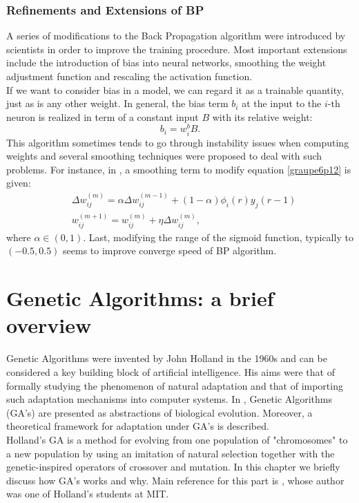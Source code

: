 \documentclass[%
    corpo=11pt,
    twoside,
    stile=classica,
    oldstyle,
    autoretitolo,
    tipotesi=magistrale,
    greek,
    evenboxes,
    english
]{toptesi}
\begin{document}
\subsection{Refinements and Extensions of BP}
A series of modifications to the Back Propagation algorithm were introduced by scientists in order to improve the training procedure. Most important extensions include the introduction of bias into neural networks, smoothing the weight adjustment function and rescaling the activation function. \\
If we want to consider bias in a model, we can regard it as a trainable quantity, just as is any other weight. In general, the bias term $b_i$ at the input to the $i$-th neuron is realized in term of a constant input $B$ with its relative weight:
\begin{equation}
b_i = w^b_i B.
\end{equation}
This algorithm sometimes tends to go through instability issues when computing weights and several smoothing techniques were proposed to deal with such problems. For instance, in \cite{sejnowski}, a smoothing term to modify equation \ref{graupe6p12} is given:
\begin{align}
&\Delta w_{ij}^{(m)} = \alpha \Delta w_{ij}^{(m-1)} + (1-\alpha)\phi_i(r)y_j(r-1)  \nonumber \\
& w_{ij}^{(m+1)} = w_{ij}^{(m)} + \eta \Delta w_{ij}^{(m)},
\end{align}
where $\alpha \in \left(0,1 \right)$.
Last, modifying the range of the sigmoid function, typically to $\left(-0.5,0.5\right)$ seems to improve converge speed of BP algorithm. 


\chapter{Genetic Algorithms: a brief overview}
Genetic Algorithms were invented by John Holland in the 1960s and can be considered a key building block of artificial intelligence. His aims were that of  formally studying the phenomenon of natural adaptation and that of importing such adaptation mechanisms into computer systems. In \cite{holland}, Genetic Algorithms (GA's) are presented as abstractions of biological evolution. Moreover, a theoretical framework for adaptation under GA's is described. \\
Holland's GA is a method for evolving from one population of "chromosomes" to a new population by using an imitation of natural selection together with the genetic-inspired operators of crossover and mutation. In this chapter we briefly discuss how GA's works and why. Main reference for this part is \cite{mit}, whose author was one of Holland's students at MIT.
\end{document}

